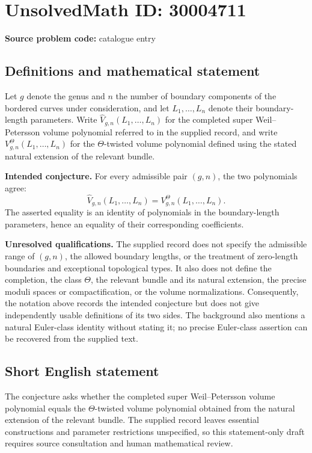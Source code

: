 \documentclass[11pt]{article}
\begin{document}
\section*{UnsolvedMath ID: 30004711}
\textbf{Source problem code:} catalogue entry
\subsection{Definitions and mathematical statement}
Let \(g\) denote the genus and \(n\) the number of boundary components of the bordered curves under consideration, and let \(L_1,\ldots,L_n\) denote their boundary-length parameters. Write \(\widehat V_{g,n}(L_1,\ldots,L_n)\) for the completed super Weil--Petersson volume polynomial referred to in the supplied record, and write \(V^\Theta_{g,n}(L_1,\ldots,L_n)\) for the \(\Theta\)-twisted volume polynomial defined using the stated natural extension of the relevant bundle.

\textbf{Intended conjecture.} For every admissible pair \((g,n)\), the two polynomials agree:
\[
\widehat V_{g,n}(L_1,\ldots,L_n)
=
V^\Theta_{g,n}(L_1,\ldots,L_n).
\]
The asserted equality is an identity of polynomials in the boundary-length parameters, hence an equality of their corresponding coefficients.

\textbf{Unresolved qualifications.} The supplied record does not specify the admissible range of \((g,n)\), the allowed boundary lengths, or the treatment of zero-length boundaries and exceptional topological types. It also does not define the completion, the class \(\Theta\), the relevant bundle and its natural extension, the precise moduli spaces or compactification, or the volume normalizations. Consequently, the notation above records the intended conjecture but does not give independently usable definitions of its two sides. The background also mentions a natural Euler-class identity without stating it; no precise Euler-class assertion can be recovered from the supplied text.
\subsection{Short English statement}
The conjecture asks whether the completed super Weil--Petersson volume polynomial equals the \(\Theta\)-twisted volume polynomial obtained from the natural extension of the relevant bundle. The supplied record leaves essential constructions and parameter restrictions unspecified, so this statement-only draft requires source consultation and human mathematical review.
\end{document}
